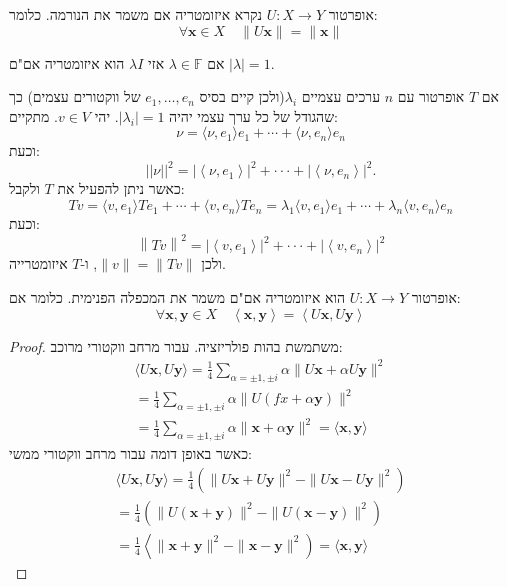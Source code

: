 \documentclass{tstextbook}
\begin{document}
\begin{definition}[איזומטריה]
אופרטור \(U:X\to Y\) נקרא איזומטריה אם משמר את הנורמה. כלומר:
$$\forall\mathbf{x}\in X\quad \|U\mathbf{x}\|=\|\mathbf{x}\|$$

\end{definition}
\begin{example}
אם \(\lambda \in \mathbb{F}\) אזי \(\lambda I\) הוא איזומטריה אם"ם \(\left\lvert  \lambda  \right\rvert=1\).

\end{example}
\begin{example}
אם \(T\) אופרטור עם \(n\) ערכים עצמיים \(\lambda_{i}\)(ולכן קיים בסיס \(e_{1},\dots,e_{n}\) של ווקטורים עצמים) כך שהגודל של כל ערך עצמי יהיה \(\left\lvert  \lambda_{i}  \right\rvert=1\). יהי \(v \in V\). מתקיים:
$$\nu=\langle\nu,e_{1}\rangle e_{1}+\cdots+\langle\nu,e_{n}\rangle e_{n}$$
וכעת:
$$\left|\left|\nu\right|\right|^{2}=|\left\langle\nu,e_{1}\right\rangle|^{2}+\cdot\cdot\cdot+|\left\langle\nu,e_{n}\right\rangle|^{2}.$$
כאשר ניתן להפעיל את \(T\) ולקבל:
$$Tv=\langle v,e_{1}\rangle Te_{1}+\cdots+\langle v,e_{n}\rangle Te_{n}=\lambda_{1}\langle v,e_{1}\rangle e_{1}+\cdots+\lambda_{n}\langle v,e_{n}\rangle e_{n}$$
וכעת:
$$\left\|T v\right\|^{2}=|\left\langle v,e_{1}\right\rangle|^{2}+\cdot\cdot\cdot+|\left\langle v,e_{n}\right\rangle|^{2}$$
ולכן \(\lVert v \rVert=\lVert Tv \rVert\), ו-\(T\) איזומטרייה.

\end{example}
\begin{proposition}
אופרטור \(U:X\to Y\) הוא איזומטריה אם"ם משמר את המכפלה הפנימית. כלומר אם:
$$\forall\mathbf{x},\mathbf{y}\in X\quad \left\langle \mathbf{x},\mathbf{y} \right \rangle =\left\langle U\mathbf{x},U\mathbf{y} \right \rangle $$

\end{proposition}
\begin{proof}
משתמשת בהות פולריזציה. עבור מרחב ווקטורי מרוכב:
$$\begin{gather}{{ \langle U\mathbf{x},U\mathbf{y} \rangle =\frac{1}{4}\sum_{\alpha=\pm1,\pm i}\alpha\|U\mathbf{x}+\alpha U\mathbf{y}\|^{2}}}\\ {{=\frac{1}{4}\sum_{\alpha=\pm1,\pm i}\alpha\|U( f{x}+\alpha\mathbf{y})\|^{2}}}\\ {{=\frac{1}{4}\sum_{\alpha=\pm1,\pm i}\alpha\|\mathbf{x}+\alpha\mathbf{y}\|^{2}=\langle \mathbf{x},\mathbf{y} \rangle }}\end{gather}$$
כאשר באופן דומה עבור מרחב ווקטורי ממשי:
$$\begin{gather}{{\langle U\mathbf{x},U\mathbf{y} \rangle =\frac{1}{4}\left( \|U\mathbf{x}+U\mathbf{y}\|^{2}-\|U\mathbf{x}-U\mathbf{y}\|^{2}\right)}}\\ {{=\frac{1}{4}\left(\|U(\mathbf{x}+\mathbf{y})\|^{2}-\|U ( \mathbf{x}-\mathbf{y})\|^{2}\right)}}\\ {{=\frac{1}{4}\left \langle \|\mathbf{x}+\mathbf{y}\|^{2}-\|\mathbf{x}-\mathbf{y}\|^{2}\right)= \langle \mathbf{x},\mathbf{y} \rangle }}\end{gather}$$

\end{proof}
\end{document}
